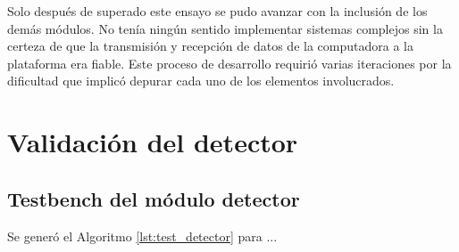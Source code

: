 		Solo después de superado este ensayo se pudo avanzar con la inclusión de los demás módulos. No tenía ningún sentido implementar sistemas complejos sin la certeza de que la transmisión y recepción de datos de la computadora a la plataforma era fiable. Este proceso de desarrollo requirió varias iteraciones por la dificultad que implicó depurar cada uno de los elementos involucrados.
	
\section{Validación del detector}

	\subsection{Testbench del módulo detector}
			
		Se generó el Algoritmo \ref{lst:test_detector} para ...
		
